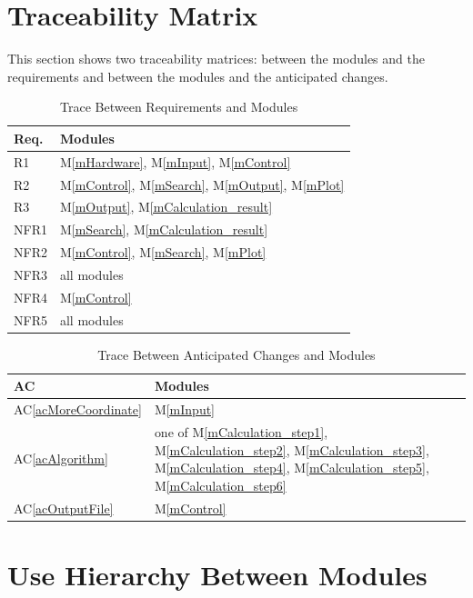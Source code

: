 \documentclass[12pt, titlepage]{article}
\newcommand{\acref}[1]{AC\ref{#1}}
\newcommand{\mref}[1]{M\ref{#1}}
\begin{document}
\section{Traceability Matrix} \label{SecTM}

This section shows two traceability matrices: between the modules and the
requirements and between the modules and the anticipated changes.

\begin{table}[H]
\centering
\begin{tabular}{p{} p{}}
\toprule
\textbf{Req.} & \textbf{Modules}\\
\midrule
R1 & \mref{mHardware}, \mref{mInput}, \mref{mControl}\\
R2 & \mref{mControl}, \mref{mSearch}, \mref{mOutput}, \mref{mPlot}\\
R3 & \mref{mOutput}, \mref{mCalculation_result}\\
NFR1 & \mref{mSearch}, \mref{mCalculation_result}\\
NFR2 & \mref{mControl},  \mref{mSearch}, \mref{mPlot}\\
NFR3 & all modules\\
NFR4 & \mref{mControl}\\
NFR5 & all modules\\

\bottomrule
\end{tabular}
\caption{Trace Between Requirements and Modules}
\label{TblRT}
\end{table}

\begin{table}[H]
\centering
\begin{tabular}{p{} p{}}
\toprule
\textbf{AC} & \textbf{Modules}\\
\midrule
\acref{acMoreCoordinate} & \mref{mInput}\\
\acref{acAlgorithm} & one of \mref{mCalculation_step1}, \mref{mCalculation_step2}, \mref{mCalculation_step3}, \mref{mCalculation_step4}, \mref{mCalculation_step5}, \mref{mCalculation_step6}\\
\acref{acOutputFile} & \mref{mControl} \\
\bottomrule
\end{tabular}
\caption{Trace Between Anticipated Changes and Modules}
\label{TblACUCT}
\end{table}

\section{Use Hierarchy Between Modules} \label{SecUse}
\end{document}

